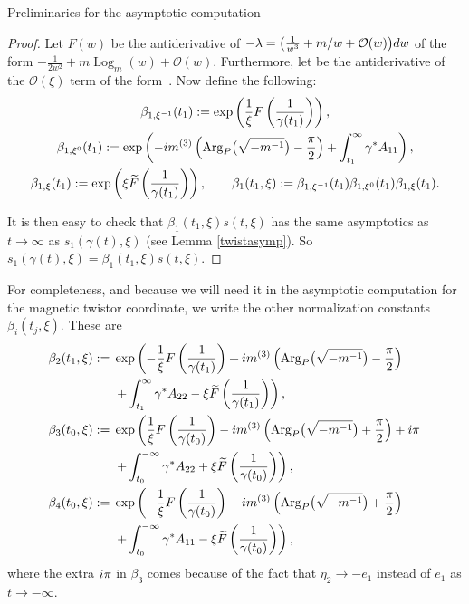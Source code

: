 \documentclass[11pt]{article}
\numberwithin{equation}{section}
\numberwithin{equation}{section}
\begin{document}
\begin{subsubsection}{Preliminaries for the asymptotic computation}
\begin{proof}
Let $F(w)$ be the antiderivative of $-\lambda=\bigl(\frac{1}{w^3} +m/w +\mathcal{O}(w)\bigr){\rm d}w$ of the form $-\frac{1}{2w^2}+m\operatorname{Log}_{m}(w)+\mathcal{O}(w)$. Furthermore, let  be the antiderivative of the $\mathcal{O}(\xi)$ term of the form~. Now define the following:
\begin{gather*}
 \beta_{1,{\xi^{-1}}}(t_1):=\exp \left(\frac{1}{\xi}F\left(\frac{1}{\gamma(t_1)}\right)\right),\\
 \beta_{1,{\xi^{0}}}(t_1):=\exp \left(- {\rm i}m^{(3)}\left(\operatorname{Arg}_P\bigl(\sqrt{-m^{-1}}\bigr)-\frac{\pi}{2}\right)+\int_{t_1}^{\infty}\gamma^*A_{11}\right),\\
 \beta_{1,\xi}(t_1):=\exp \left(\xi \widetilde{F}\left(\frac{1}{\gamma(t_1)}\right)\right),\qquad
 \beta_1(t_1,\xi):=\beta_{1,{\xi^{-1}}}(t_1)\beta_{1,{\xi^{0}}}(t_1)\beta_{1,\xi}(t_1).
\end{gather*}

It is then easy to check that $\beta_1(t_1,\xi)s(t,\xi)$ has the same asymptotics as $t\to \infty$ as $s_1(\gamma(t),\xi)$ (see Lemma \ref{twistasymp}). So $s_1(\gamma(t),\xi)=\beta_1(t_1,\xi)s(t,\xi)$.
\end{proof}

For completeness, and because we will need it in the asymptotic computation for the magnetic twistor coordinate, we write the other normalization constants $\beta_i(t_j,\xi)$. These are
\begin{align*}
 \beta_2(t_1,\xi):={}&\exp \left(-\frac{1}{\xi}F\left(\frac{1}{\gamma(t_1)}\right) +{\rm i}m^{(3)}\left(\operatorname{Arg}_P\bigl(\sqrt{-m^{-1}}\bigr)-\frac{\pi}{2}\right)\right.\\
 &\left.+\int_{t_1}^{\infty}\gamma^*A_{22} - \xi \widetilde{F}\left(\frac{1}{\gamma(t_1)}\right)\right),\\
 \beta_3(t_0,\xi):={}&\exp \left(\frac{1}{\xi}F\left(\frac{1}{\gamma(t_0)}\right)- {\rm i}m^{(3)}\left(\operatorname{Arg}_P\bigl(\sqrt{-m^{-1}}\bigr)+\frac{\pi}{2}\right)+{\rm i}\pi\right.\\
&\left.+\int_{t_0}^{-\infty}\gamma^*A_{22} + \xi \widetilde{F}\left(\frac{1}{\gamma(t_0)}\right)\right),\\
 \beta_4(t_0,\xi):={}&\exp \left(-\frac{1}{\xi}F\left(\frac{1}{\gamma(t_0)}\right) +{\rm i}m^{(3)}\left(\operatorname{Arg}_P\bigl(\sqrt{-m^{-1}}\bigr)+\frac{\pi}{2}\right)\right.\\
& \left.+\int_{t_0}^{-\infty}\gamma^*A_{11} - \xi \widetilde{F}\left(\frac{1}{\gamma(t_0)}\right)\right),
\end{align*}
where the extra ${\rm i}\pi$ in $\beta_3$ comes because of the fact that $\eta_2 \to -e_1$ instead of $e_1$ as $t\to -\infty$.


\end{subsubsection}
\end{document}
